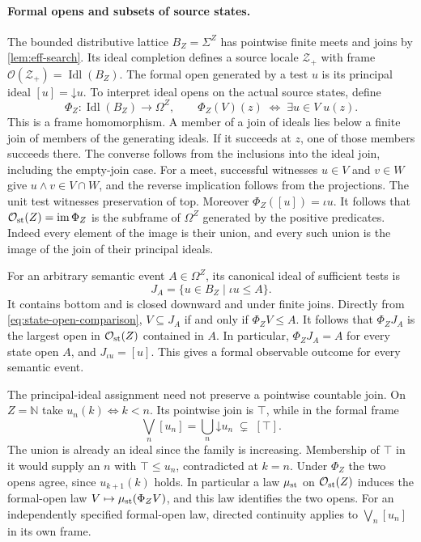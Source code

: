 \documentclass[11pt,a4paper]{article}
\theoremstyle{definition}
\theoremstyle{remark}\newaliascnt{remark}{theorem}
\newcommand{\N}{\mathbb N}
\newcommand{\Idl}{\operatorname{Idl}}
\numberwithin{equation}{section}
\begin{document}
\paragraph{Formal opens and subsets of source states.}
The bounded distributive lattice $B_Z=\Sigma^Z$ has pointwise finite meets and joins by \cref{lem:eff-search}. Its ideal completion defines a source locale $\mathcal Z_+$ with frame $\mathcal O(\mathcal Z_+)=\Idl(B_Z)$. The formal open generated by a test $u$ is its principal ideal $[u]=\mathord\downarrow u$. To interpret ideal opens on the actual source states, define
\begin{equation}\label{eq:state-open-comparison}
 \Phi_Z:\Idl(B_Z)\longrightarrow\Omega^Z,\qquad
 \Phi_Z(V)(z)\;\Longleftrightarrow\;\exists u\in V\;u(z).
\end{equation}
This is a frame homomorphism. A member of a join of ideals lies below a finite join of members of the generating ideals. If it succeeds at $z$, one of those members succeeds there. The converse follows from the inclusions into the ideal join, including the empty-join case. For a meet, successful witnesses $u\in V$ and $v\in W$ give $u\wedge v\in V\cap W$, and the reverse implication follows from the projections. The unit test witnesses preservation of top. Moreover $\Phi_Z([u])=\iota u$. It follows that $\mathcal O_{\rm st}(Z)=\operatorname{im}\Phi_Z$ is the subframe of $\Omega^Z$ generated by the positive predicates. Indeed every element of the image is their union, and every such union is the image of the join of their principal ideals.

For an arbitrary semantic event $A\in\Omega^Z$, its canonical ideal of sufficient tests is
\[
 J_A=\{u\in B_Z\mid\iota u\le A\}.
\]
It contains bottom and is closed downward and under finite joins. Directly from \eqref{eq:state-open-comparison},
$V\subseteq J_A$ if and only if $\Phi_Z V\le A$. It follows that $\Phi_Z J_A$ is the largest open in $\mathcal O_{\rm st}(Z)$ contained in $A$. In particular, $\Phi_Z J_A=A$ for every state open $A$, and $J_{\iota u}=[u]$. This gives a formal observable outcome for every semantic event.

The principal-ideal assignment need not preserve a pointwise countable join. On $Z=\N$ take $u_n(k)\Leftrightarrow k<n$. Its pointwise join is $\top$, while in the formal frame
\[
 \bigvee_n[u_n]=\bigcup_n\mathord\downarrow u_n
       \;\subsetneq\;[\top].
\]
The union is already an ideal since the family is increasing. Membership of $\top$ in it would supply an $n$ with $\top\le u_n$, contradicted at $k=n$. Under $\Phi_Z$ the two opens agree, since $u_{k+1}(k)$ holds. In particular a law $\mu_{\rm st}$ on $\mathcal O_{\rm st}(Z)$ induces the formal-open law $V\mapsto\mu_{\rm st}(\Phi_Z V)$, and this law identifies the two opens. For an independently specified formal-open law, directed continuity applies to $\bigvee_n[u_n]$ in its own frame.
\end{document}
